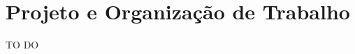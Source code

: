 \chapter[Projeto e Organização de Trabalho]{Projeto e Organização de Trabalho}
\label{chap:organizacao}

	TO DO